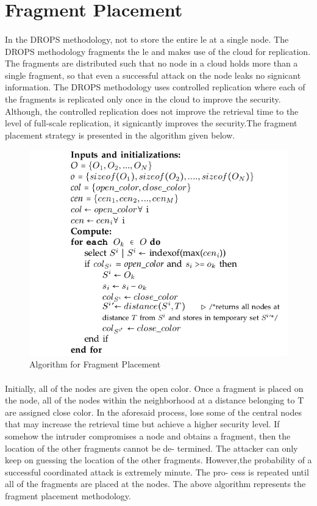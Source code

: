\section{Fragment Placement}
\paragraph*{}
In the DROPS methodology, not to store the entire le at a single node. The DROPS
methodology fragments the le and makes use of the cloud for replication. The fragments
are distributed such that no node in a cloud holds more than a single fragment, so that even
a successful attack on the node leaks no signicant information. The DROPS methodology
uses controlled replication where each of the fragments is replicated only once in the cloud
to improve the security. Although, the controlled replication does not improve the retrieval
time to the level of full-scale replication, it signicantly improves the security.The fragment placement strategy is presented in
the algorithm given below.
\\
\begin{figure}
	\centering
	\includegraphics[scale=0.5]{placementalgo}
	\caption{Algorithm for Fragment Placement}
\end{figure}

\paragraph*{}

Initially, all of the nodes are given the open color. Once a fragment is placed on the
node, all of the nodes within the neighborhood at a distance belonging to T are assigned
close color. In the aforesaid process, lose some of the central nodes that may increase the
retrieval time but achieve a higher security level. If somehow the intruder compromises
a node and obtains a fragment, then the location of the other fragments cannot be de-
termined. The attacker can only keep on guessing the location of the other fragments.
However,the probability of a successful coordinated attack is extremely minute. The pro-
cess is repeated until all of the fragments are placed at the nodes. The above algorithm
represents the fragment placement methodology.
